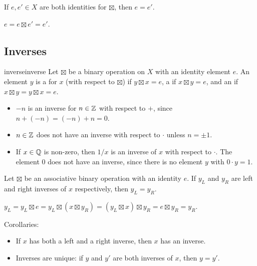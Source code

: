 \documentclass[12pt,letterpaper]{report}
\begin{document}
\begin{lem}{}{}
  If $e, e' \in X$ are both identities for $\boxtimes$, then $e = e'$.
\end{lem}

\begin{thmproof}
  $e = e \boxtimes e' = e'$.
\end{thmproof}

\pagebreak
\subsection{Inverses}

\begin{defn}{inverse}{inverse}
  Let $\boxtimes$ be a binary operation on $X$ with an identity element $e$.
  An element $y$ is a  for $x$ (with respect to $\boxtimes$) if
  $y \boxtimes x = e$, a  if $x \boxtimes y = e$, and an  if
  $x \boxtimes y = y \boxtimes x = e$.
\end{defn}

\begin{ex}
  \begin{itemize}
    \item
    $-n$ is an inverse for $n \in \mathbb{Z}$ with respect to $+$, since $n + (-n) = (-n) + n = 0$.
    \item
    $n \in \mathbb{Z}$ does not have an inverse with respect to $\cdot$ unless $n = \pm 1$.
    \item
    If $x \in \mathbb{Q}$ is non-zero, then $1/x$ is an inverse of $x$ with respect to $\cdot$.
    The element $0$ does not have an inverse, since there is no element $y$ with $0 \cdot y = 1$.
  \end{itemize}
\end{ex}

\begin{lem}{}{}
  Let $\boxtimes$ be an associative binary operation with an identity $e$.
  If $y_L$ and $y_R$ are left and right inverses of $x$ respectively, then $y_L = y_R$.
\end{lem}

\begin{thmproof}
  $y_L = y_L \boxtimes e = y_L \boxtimes (x \boxtimes y_R) = (y_L \boxtimes x) \boxtimes y_R =
    e \boxtimes y_R = y_R$.
\end{thmproof}

Corollaries:
\begin{itemize}
  \item If $x$ has both a left and a right inverse, then $x$ has an inverse.
  \item Inverses are unique: if $y$ and $y'$ are both inverses of $x$, then $y = y'$.
\end{itemize}
\end{document}

